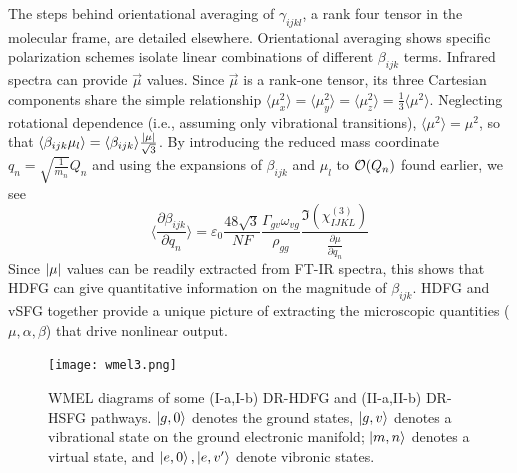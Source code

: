 \documentclass[aip, jcp, reprint, onecolumn]{revtex4-2}
\begin{document}
The steps behind orientational averaging of $\gamma_{ijkl}$, a rank four tensor in the molecular frame, are detailed elsewhere.\cite{Andrews1977, McDonnell2024}
Orientational averaging shows specific polarization schemes isolate linear combinations of different $\beta_{ijk}$ terms. 
Infrared spectra can provide $\vec{\mu}$ values.
Since $\vec{\mu}$ is a rank-one tensor, its three Cartesian components share the simple relationship $\langle {\mu^2_x} \rangle = \langle {\mu^2_y} \rangle = \langle {\mu^2_z} \rangle = \frac{1}{3}\langle {\mu^2} \rangle$. \cite{RN459}
Neglecting rotational dependence (i.e., assuming only vibrational transitions), $\langle {\mu^2} \rangle = \mu^2$, so that $\langle \beta_{ijk} \mu_l \rangle = \langle \beta_{ijk} \rangle \frac{\abs{\mu}}{\sqrt{3}}$.
By introducing the reduced mass coordinate $q_n = \sqrt{\frac{1}{m_n}} Q_n$ and using the expansions of $\beta_{ijk}$ and $\mu_{l}$ to $\order{Q_n}$ found earlier, we see
\begin{equation}\label{betasive}
	\langle \frac{\partial \beta_{ijk}}{\partial q_n} \rangle = \varepsilon_0 \frac{48 \sqrt{3} }{NF}  \frac{\Gamma_{gv} \omega_{vg}}{\rho_{gg}} \frac{\Im(\chi^{(3)}_{IJKL})}{\frac{\partial \mu}{\partial q_n}}
\end{equation}
Since $\abs{\mu}$ values can be readily extracted from FT-IR spectra,\cite{RN412} this shows that HDFG can give quantitative information on the magnitude of $\beta_{ijk}$.
HDFG and vSFG together provide a unique picture of extracting the microscopic quantities ($\mu, \alpha, \beta$) that drive nonlinear output.

\begin{figure}[!htbp]
	\centering
	\texttt{[image: wmel3.png]}
	\caption{WMEL diagrams of some (I-a,I-b) DR-HDFG and (II-a,II-b) DR-HSFG pathways. $\ket{g,0}$ denotes the ground states, $\ket{g,v}$ denotes a vibrational state on the ground electronic manifold; $\ket{m,n}$ denotes a virtual state, and $\ket{e,0}, \ket{e,v'}$ denote vibronic states.}
	\label{fig:doubsive}
\end{figure}
\end{document}
